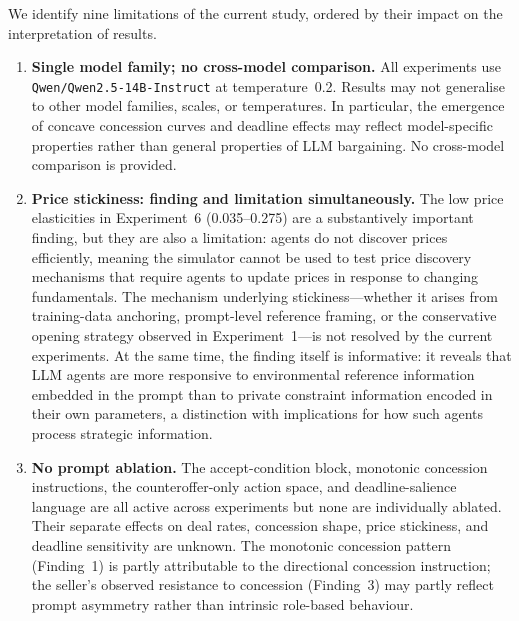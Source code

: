 We identify nine limitations of the current study, ordered by their impact on the interpretation of results.

\begin{enumerate}
    \item \textbf{Single model family; no cross-model comparison.}  All experiments use \texttt{Qwen/Qwen2.5-14B-Instruct} at temperature~0.2.  Results may not generalise to other model families, scales, or temperatures.  In particular, the emergence of concave concession curves and deadline effects may reflect model-specific properties rather than general properties of LLM bargaining.  No cross-model comparison is provided.

    \item \textbf{Price stickiness: finding and limitation simultaneously.}  The low price elasticities in Experiment~6 (0.035--0.275) are a substantively important finding, but they are also a limitation: agents do not discover prices efficiently, meaning the simulator cannot be used to test price discovery mechanisms that require agents to update prices in response to changing fundamentals.  The mechanism underlying stickiness---whether it arises from training-data anchoring, prompt-level reference framing, or the conservative opening strategy observed in Experiment~1---is not resolved by the current experiments.  At the same time, the finding itself is informative: it reveals that LLM agents are more responsive to environmental reference information embedded in the prompt than to private constraint information encoded in their own parameters, a distinction with implications for how such agents process strategic information.

    \item \textbf{No prompt ablation.}  The accept-condition block, monotonic concession instructions, the counteroffer-only action space, and deadline-salience language are all active across experiments but none are individually ablated.  Their separate effects on deal rates, concession shape, price stickiness, and deadline sensitivity are unknown.  The monotonic concession pattern (Finding~1) is partly attributable to the directional concession instruction; the seller's observed resistance to concession (Finding~3) may partly reflect prompt asymmetry rather than intrinsic role-based behaviour.


\end{enumerate}
